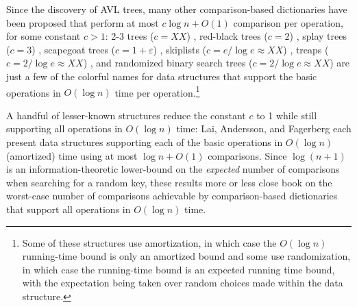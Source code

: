 \documentclass{patmorin}
\newcommand{\eps}{\varepsilon}
\begin{document}
Since the discovery of AVL trees, many other comparison-based dictionaries
have been proposed that perform at most $c\log n + O(1)$ comparison
per operation, for some constant $c>1$:  2-3 trees ($c=XX$) \cite{X},
red-black trees ($c=2$) \cite{X}, splay trees ($c=3$) \cite{X}, scapegoat
trees ($c=1+\eps$) \cite{X, Y}, skiplists ($c=e/\log e\approx XX$)
\cite{X,Y}, treaps ($c=2/\log e\approx XX$) \cite{X,Y}, and randomized
binary search trees ($c=2/\log e\approx XX$) \cite{X} are just a few of
the colorful names for data structures that support the basic operations
in $O(\log n)$ time per operation.\footnote{Some of these structures
use amortization, in which case the $O(\log n)$ running-time bound is
only an amortized bound and some use randomization, in which case the
running-time bound is an expected running time bound, with the expectation
being taken over random choices made within the data structure.}

A handful of lesser-known structures reduce the constant $c$ to 1 while
still supporting all operations in $O(\log n)$ time: Lai, Andersson, and
Fagerberg \cite{X,Y,Z} each present data structures supporting each of
the basic operations in $O(\log n)$ (amortized) time using at most $\log
n + O(1)$ comparisons.  Since $\log(n+1)$ is an information-theoretic
lower-bound on the \emph{expected} number of comparisons when searching
for a random key, these results more or less close book on the worst-case
number of comparisons achievable by comparison-based dictionaries that
support all operations in $O(\log n)$ time.



\end{document}
